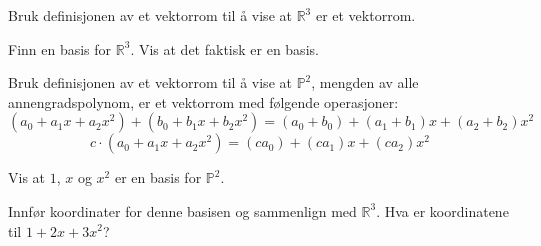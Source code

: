 \begin{oppgave}

\begin{punkt}
Bruk definisjonen av et vektorrom til å vise at $\mathbb{R}^3$ er et vektorrom.
\end{punkt}

\begin{punkt}
Finn en basis for $\mathbb{R}^3$. Vis at det faktisk er en basis.
\end{punkt}

\begin{punkt}
Bruk definisjonen av et vektorrom til å vise at $\mathbb{P}^2$, mengden av alle annengradspolynom, er et vektorrom med følgende operasjoner:
$$(a_0+a_1x+a_2x^2)+(b_0+b_1x+b_2x^2)=(a_0+b_0)+(a_1+b_1)x+(a_2+b_2)x^2$$
$$c\cdot (a_0+a_1x+a_2x^2)=(ca_0)+(ca_1)x+(ca_2)x^2$$
\end{punkt}

\begin{punkt}
Vis at $1$, $x$ og $x^2$ er en basis for $\mathbb{P}^2$. 
\end{punkt}

\begin{punkt}
Innfør koordinater for denne basisen og sammenlign med $\mathbb{R}^3$. Hva er koordinatene til $1+2x+3x^2$?
\end{punkt}

\end{oppgave}


